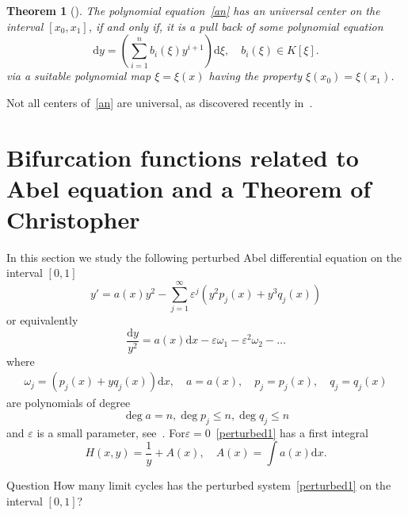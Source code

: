 \documentclass[11pt]{article}
\newtheorem{theo}{Theorem}[section]
\theoremstyle{definition}
\newenvironment{enonce*}[1]{\par\medskip\noindent\textbf{#1.}\itshape}{\par\medskip}
\numberwithin{equation}{section}
\numberwithin{figure}{section}
\numberwithin{table}{section}
\newcommand*{\dd}{\mathrm{d}}
\newcommand*{\dx}{\dd x}
\newcommand*{\dy}{\dd y}
\begin{document}
\begin{theo}[{\cite[Corollary~1.20]{brud06}}]\label{universal}
The polynomial equation~\eqref{an} has an universal center on the interval $[x_0,x_1]$, if and only if, it is a pull back of some polynomial equation
\begin{equation}\label{bn}
\dy = \left(\sum_{i=1}^n b_i(\xi) y^{i+1}\right) \dd\xi,\quad b_i(\xi) \in K[\xi].
\end{equation}
via a suitable polynomial map $\xi = \xi (x)$ having the property $\xi(x_0)=\xi(x_1)$.
\end{theo}

Not all centers of~\eqref{an} are universal, as discovered recently in~\cite{ggs18}.


\section{Bifurcation functions related to Abel equation and a Theorem of Christopher}\label{section3}

In this section we study the following perturbed Abel differential equation on the interval $[0,1]$
\[
y' = a(x) y^2 - \sum_{j= 1}^\infty \varepsilon^j\left(y^2 p_j(x)+ y^3 q_j(x)\right)
\]
or equivalently
\begin{equation}\label{perturbed1}
\frac{\dy}{y^2} = a(x) \dx - \varepsilon \omega_1 - \varepsilon^2\omega_2 - \dots
\end{equation}
where
\begin{gather*}
\omega_j = (p_j(x)+ y q_j(x)) \dx,\quad
a=a(x),\quad p_j =p_j(x),\quad q_j=q_j(x)
\end{gather*}
are polynomials of degree
\[
\deg a = n, \deg p_j \leq n, \deg q_j \leq n
\]
and $\varepsilon$ is a small parameter, see~\cite{bfy98,bfy99,bfy00,chri00,yomd03}. For\linebreak $\varepsilon = 0$~\eqref{perturbed1} has a first integral
\[
H(x,y)= \frac1y + A(x), \quad A(x) = \int a(x) \dx.
\]

\begin{enonce*}[plain]{Question}
How many limit cycles has the perturbed system~\eqref{perturbed1} on the interval $[0,1]$?
\end{enonce*}
\end{document}
